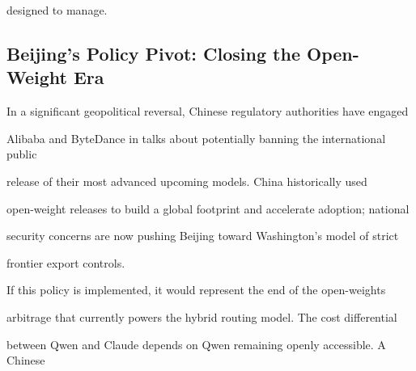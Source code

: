 designed to manage.











\subsection{Beijing's Policy Pivot: Closing the Open-Weight Era}











In a significant geopolitical reversal, Chinese regulatory authorities have engaged





Alibaba and ByteDance in talks about potentially banning the international public





release of their most advanced upcoming models. China historically used





open-weight releases to build a global footprint and accelerate adoption; national





security concerns are now pushing Beijing toward Washington's model of strict





frontier export controls.











If this policy is implemented, it would represent the end of the open-weights





arbitrage that currently powers the hybrid routing model. The cost differential





between Qwen and Claude depends on Qwen remaining openly accessible. A Chinese





